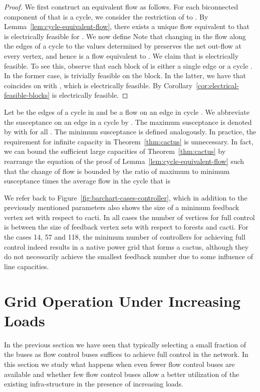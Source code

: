 \documentclass{article}[11pt,a4paper]
\begin{document}
\begin{proof}
  We first construct an equivalent flow  as follows.  For each
  biconnected component  of  that is a cycle, we consider the
  restriction  of  to .  By
  Lemma~\ref{lem:cycle-equivalent-flow}, there exists a unique
   flow  equivalent to  that is electrically
  feasible for .  We now define 
Note that changing in  the flow along the edges of a cycle  to
the values determined by  preserves the net out-flow at every
vertex, and hence  is a flow equivalent to .  We claim that
 is electrically feasible.  To see this, observe that each block
of  is either a single edge or a cycle .  In the former case,
 is trivially feasible on the block.  In the latter, we have that
 coincides on  with , which is electrically feasible.  By
Corollary~\ref{cor:electrical-feasible-blocks}  is electrically
feasible.
\end{proof}
Let  be the edges of a cycle in  and  be a flow on an edge  in cycle . 
We abbreviate the susceptance  on an edge in a cycle by . The maximum susceptance is denoted by  with  for all . 
The minimum susceptance  is defined analogously.
In practice, the requirement for infinite capacity in Theorem~\ref{thm:cactus} is unnecessary. In fact, we 
can bound the sufficient large capacities of Theorem~\ref{thm:cactus} 
by rearrange the equation of the proof of Lemma~\ref{lem:cycle-equivalent-flow} 
such that the change of flow is bounded by the ratio of maximum to minimum susceptance times the average flow in the cycle  that is
 

We refer back to Figure~\ref{fig:barchart-cases-controller}, which in
addition to the previously mentioned parameters also shows the size of
a minimum feedback vertex set with respect to cacti.  In all cases the
number of vertices for full control is between the size of feedback
vertex sets with respect to forests and cacti.  For the cases 14, 57
and 118, the minimum number of controllers for achieving full control
indeed results in a native power grid that forms a cactus, although
they do not necessarily achieve the smallest feedback number due to
some influence of line capacities.
\section{Grid Operation Under Increasing Loads}	
\label{sec:grid-control-when-approaching-capacity-limits}
In the previous section we have seen that typically selecting a small
fraction of the buses as flow control buses suffices to achieve full
control in the network.  In this section we study what happens when
even fewer flow control buses are available and whether few flow control buses
allow a better utilization of the existing infra-structure in the
presence of increasing loads.
\end{document}
